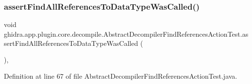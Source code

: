 \subsubsection{\texorpdfstring{assertFindAllReferencesToDataTypeWasCalled()}{assertFindAllReferencesToDataTypeWasCalled()}}
{\footnotesize\ttfamily void ghidra.\+app.\+plugin.\+core.\+decompile.\+Abstract\+Decompiler\+Find\+References\+Action\+Test.\+assert\+Find\+All\+References\+To\+Data\+Type\+Was\+Called (\begin{DoxyParamCaption}{ }\end{DoxyParamCaption})\hspace{0.3cm}{\ttfamily [inline]}, {\ttfamily [protected]}}



Definition at line 67 of file Abstract\+Decompiler\+Find\+References\+Action\+Test.\+java.

